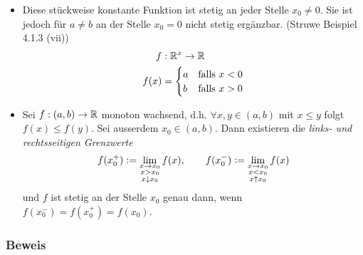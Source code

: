 \begin{itemize}
\item Diese stückweise konstante Funktion ist stetig an jeder Stelle $x_{0} \neq 0$. Sie ist jedoch für $a\neq b$ an der Stelle $x_{0}=0$ nicht stetig ergänzbar. (Struwe Beispiel 4.1.3 (vii))
\begin{align*}f&:\mathbb{R}^{x}\to\mathbb{R} \\ f(x)&=\begin{cases}a &\text{falls } x<0 \\ b &\text{falls } x>0\end{cases} \end{align*}
\item Sei $f:(a,b)\to\mathbb{R}$ monoton wachsend, d.h. $\forall x,y\in(a,b)$ mit $x\leq y$ folgt $f(x)\leq f(y)$. Sei ausserdem $x_{0}\in (a,b)$. Dann existieren die \emph{links- und rechtsseitigen Grenzwerte} 
\[ f(x_{0}^{+}) \vcentcolon= \lim_{\substack{x\to x_{0} \\ x > x_{0} \\ x \downarrow x_{0}}}f(x), \quad\quad f(x_{0}^{-})\vcentcolon= \lim_{\substack{x\to x_{0} \\ x < x_{0} \\ x \uparrow x_{0}}}f(x) \]
und $f$ ist stetig an der Stelle $x_{0}$ genau dann, wenn $f(x_{0}^{-})=f(x_{0}^{+})=f(x_{0})$.
\end{itemize}
\subsubsection*{Beweis}